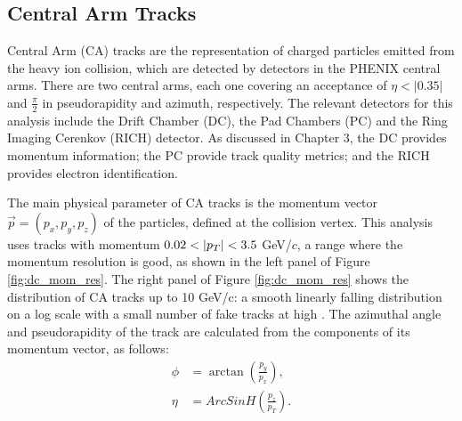 \subsection{Central Arm Tracks}
Central Arm (CA) tracks are the representation of charged particles emitted from the heavy ion collision, which are detected by detectors in the PHENIX central arms. There are two central arms, each one covering an acceptance of $\eta < |0.35|$ and $\frac{\pi}{2}$ in pseudorapidity and azimuth, respectively. The relevant detectors for this analysis include the Drift Chamber (DC), the Pad Chambers (PC) and the Ring Imaging Cerenkov (RICH) detector. As discussed in Chapter 3, the DC provides momentum information; the PC provide track quality metrics; and the RICH provides electron identification. 

The main physical parameter of CA tracks is the momentum vector $\vec{p} = (p_x, p_y, p_z)$ of the particles, defined at the collision vertex. This analysis uses tracks with momentum $0.02 < |\mbox{$p_T$}| < 3.5$ GeV/$c$, a \pt range where the momentum resolution is good, as shown in the left panel of Figure \ref{fig:dc_mom_res}. The right panel of Figure \ref{fig:dc_mom_res} shows the \pt distribution of CA tracks up to 10 GeV/c: a smooth linearly falling distribution on a log scale with a small number of fake tracks at high \pt. The azimuthal angle and pseudorapidity of the track are calculated from the components of its momentum vector, as follows: 
\begin{align}
\phi &= \arctan( \frac{p_y}{p_x} ),\\
\eta &= ArcSinH(\frac{p_z}{p_T}). 
\label{eqn:phi_eta_form}
\end{align}

